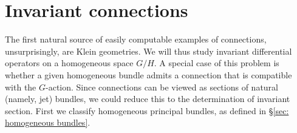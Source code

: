 




\section{Invariant connections}\label{sec: invariant connections}

The first natural source of easily computable examples of connections, unsurprisingly, are Klein geometries. We will thus study invariant differential operators on a homogeneous space $G\slash H$. A special case of this problem is whether a given homogeneous bundle admits a connection that is compatible with the $G$-action. Since connections can be viewed as sections of natural (namely, jet) bundles, we could reduce this to the determination of invariant section. First we classify homogeneous principal bundles, as defined in \S\ref{sec: homogeneous bundles}.

